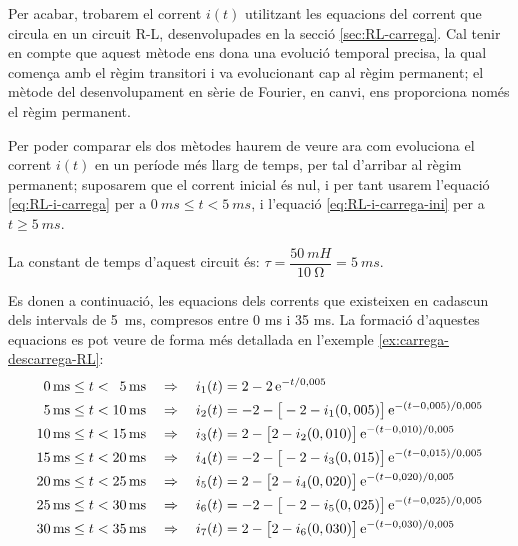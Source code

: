 \begin{exemple}
    Per acabar, trobarem el corrent $i(t)$ utilitzant les equacions del corrent que circula en un circuit R-L, desenvolupades en la secció \vref{sec:RL-carrega}. Cal tenir en compte que aquest mètode ens dona una evolució temporal precisa, la qual comença amb el règim transitori i va evolucionant cap al règim permanent; el mètode del desenvolupament en sèrie de Fourier, en canvi, ens proporciona només el règim permanent.

    Per  poder comparar els dos mètodes haurem de veure  ara com evoluciona el corrent $i(t)$ en un període més llarg de temps, per tal d'arribar al règim permanent; suposarem que el corrent inicial és nul, i per tant usarem l'equació \eqref{eq:RL-i-carrega} per a $\qty{0}{ms} \leq t < \qty{5}{ms}$, i l'equació \eqref{eq:RL-i-carrega-ini} per a $t \geq \qty{5}{ms}$.

    La constant de temps d'aquest circuit és: $\tau = \dfrac{\qty{50}{mH}}{\qty{10}{\ohm}} = \qty{5}{ms}$.


    Es donen a continuació, les equacions dels corrents que existeixen en cadascun dels intervals de \qty{5}{ms}, compresos entre 0 ms i 35 ms. La formació d'aquestes equacions es pot veure de forma més detallada en l'exemple \vref{ex:carrega-descarrega-RL}:
    \begin{align*}
      \phantom{0}\qty{0}{ms} \leq t < \phantom{0}\qty{5}{ms}  & \quad\Rightarrow\quad i_1(t) = 2 - 2 \,\mathrm{e}^{-t/0,005} \\
      \phantom{0}\qty{5}{ms} \leq t < \qty{10}{ms} & \quad\Rightarrow\quad i_2(t) = -2 - \big[-2 - i_1(0,005)\big]\, \mathrm{e}^{-(t-0,005)/0,005}  \\
      \qty{10}{ms}\leq t < \qty{15}{ms} & \quad\Rightarrow\quad i_3(t) = 2 - \big[2 - i_2(0,010)\big]\, \mathrm{e}^{-(t-0,010)/0,005} \\
      \qty{15}{ms} \leq t < \qty{20}{ms} & \quad\Rightarrow\quad i_4(t) = -2 - \big[-2 - i_3(0,015)\big]\, \mathrm{e}^{-(t-0,015)/0,005}  \\
      \qty{20}{ms}\leq t < \qty{25}{ms} & \quad\Rightarrow\quad i_5(t) = 2 - \big[2 - i_4(0,020)\big]\, \mathrm{e}^{-(t-0,020)/0,005} \\
      \qty{25}{ms} \leq t < \qty{30}{ms} & \quad\Rightarrow\quad i_6(t) = -2 - \big[-2 - i_5(0,025)\big]\, \mathrm{e}^{-(t-0,025)/0,005}  \\
      \qty{30}{ms}\leq t < \qty{35}{ms} & \quad\Rightarrow\quad i_7(t) = 2 - \big[2 - i_6(0,030)\big]\, \mathrm{e}^{-(t-0,030)/0,005}
    \end{align*}


\end{exemple}
